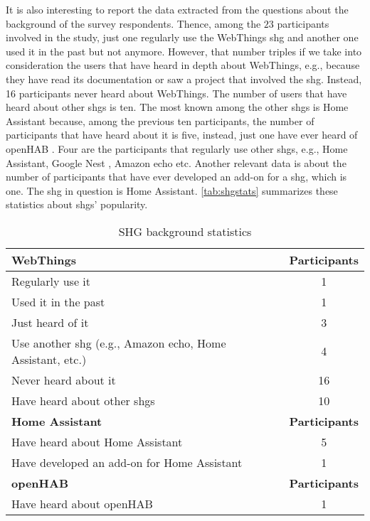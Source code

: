 It is also interesting to report the data extracted from the questions about the background of the survey respondents. Thence, among the $23$ participants involved in the study, just one regularly use the WebThings \gls{shg} and another one used it in the past but not anymore. However, that number triples if we take into consideration the users that have heard in depth about WebThings, e.g., because they have read its documentation or saw a project that involved the \gls{shg}. Instead, 16 participants never heard about WebThings.
The number of users that have heard about other \glspl{shg} is ten. The most known among the other \glspl{shg} is Home Assistant \cite{homehomeassistant} because, among the previous ten participants, the number of participants that have heard about it is five, instead, just one have ever heard of openHAB \cite{openhabhomepage}. Four are the participants that regularly use other \glspl{shg}, e.g., Home Assistant, Google Nest \cite{googlenesthome}, Amazon echo \cite{amazonecho} etc.
Another relevant data is about the number of participants that have ever developed an add-on for a \gls{shg}, which is one. The \gls{shg} in question is Home Assistant. \autoref{tab:shgstats} summarizes these statistics about \glspl{shg}' popularity.

\begin{table}[h!]
    \centering
    \begin{tabular}{| l | c |}
    \hline
    \textbf{WebThings} & \textbf{Participants}\\
    \hline
    Regularly use it & 1\\
    \hline
    Used it in the past & 1\\
    \hline
    Just heard of it & 3\\
    \hline
    Use another \gls{shg} (e.g., Amazon echo, Home Assistant, etc.) & 4\\
    \hline
    Never heard about it & 16 \\
    \hline
    Have heard about other \glspl{shg} & 10\\
    \hline
    \textbf{Home Assistant} & \textbf{Participants}\\
    \hline
    Have heard about Home Assistant & 5\\
    \hline
    Have developed an add-on for Home Assistant & 1\\
    \hline
    \textbf{openHAB} & \textbf{Participants}\\
    \hline
    Have heard about openHAB & 1\\
    \hline
    \end{tabular}
    \caption{SHG background statistics}
    \label{tab:shgstats}
\end{table}

